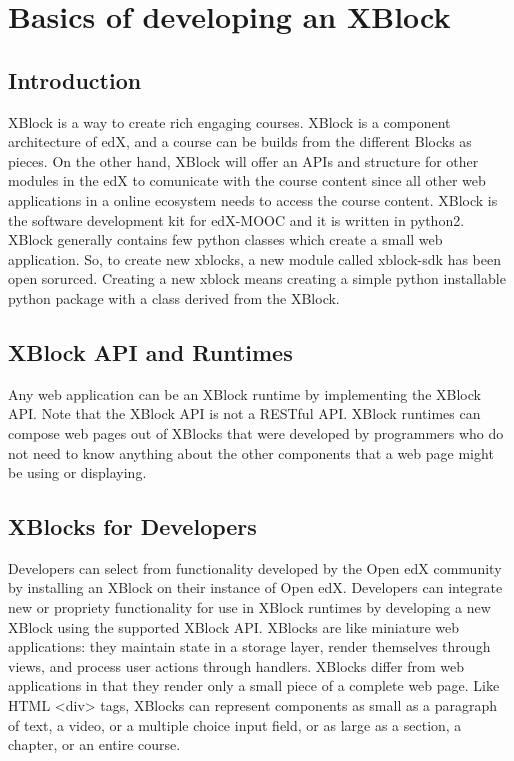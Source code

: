 \chapter{Basics of developing an XBlock}
\section{Introduction}
XBlock is a way to create rich engaging courses. XBlock is a component architecture of edX, and a
course can be builds from the different Blocks as pieces. On the other hand, XBlock will offer an
APIs and structure for other modules in the edX to comunicate with the course content since all
other web applications in a online ecosystem needs to access the course content.\newline
XBlock is the software development kit for edX-MOOC and it is written in python2. XBlock
generally contains few python classes which create a small web application. So, to create new
xblocks, a new module called xblock-sdk has been open sorurced. Creating a new xblock means
creating a simple python installable python package with a class derived from the XBlock.

\section{XBlock API and Runtimes}
Any web application can be an XBlock runtime by implementing the XBlock API. Note that the
XBlock API is not a RESTful API. XBlock runtimes can compose web pages out of XBlocks that
were developed by programmers who do not need to know anything about the other components
that a web page might be using or displaying.

\section{XBlocks for Developers}
Developers can select from functionality developed by the Open edX community by installing an
XBlock on their instance of Open edX. Developers can integrate new or propriety functionality for
use in XBlock runtimes by developing a new XBlock using the supported XBlock API.\newline\newline
XBlocks are like miniature web applications: they maintain state in a storage layer, render
themselves through views, and process user actions through handlers. XBlocks differ from web
applications in that they render only a small piece of a complete web page. Like HTML <div> tags,
XBlocks can represent components as small as a paragraph of text, a video, or a multiple choice
input field, or as large as a section, a chapter, or an entire course.
